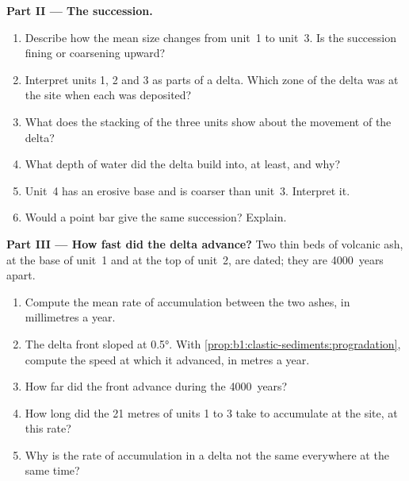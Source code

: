 \begin{problem}
\medskip
\noindent\textbf{Part II --- The succession.}
\begin{enumerate}[resume]
  \item Describe how the mean size changes from unit~1 to unit~3. Is the
        succession fining or coarsening upward?
  \item Interpret units 1, 2 and 3 as parts of a delta. Which zone of the delta
        was at the site when each was deposited?
  \item What does the stacking of the three units show about the movement of
        the delta?
  \item What depth of water did the delta build into, at least, and why?
  \item Unit~4 has an erosive base and is coarser than unit~3. Interpret it.
  \item Would a point bar give the same succession? Explain.
\end{enumerate}

\medskip
\noindent\textbf{Part III --- How fast did the delta advance?}
Two thin beds of volcanic ash, at the base of unit~1 and at the top of
unit~2, are dated; they are \num{4000}~years apart.
\begin{enumerate}[resume]
  \item Compute the mean rate of accumulation between the two ashes, in
        millimetres a year.
  \item The delta front sloped at \ang{0.5}. With
        \cref{prop:b1:clastic-sediments:progradation}, compute the speed at
        which it advanced, in metres a year.
  \item How far did the front advance during the \num{4000}~years?
  \item How long did the 21 metres of units 1 to 3 take to accumulate at the
        site, at this rate?
  \item Why is the rate of accumulation in a delta not the same everywhere at
        the same time?
\end{enumerate}


\end{problem}
